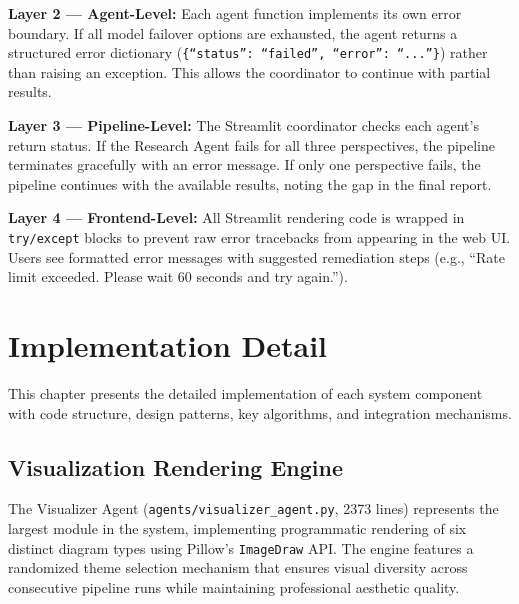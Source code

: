 \documentclass[a4paper,12pt,openany]{report}
\begin{document}
\textbf{Layer 2 --- Agent-Level:} Each agent function implements its own error boundary. If all model failover options are exhausted, the agent returns a structured error dictionary (\texttt{\{``status'': ``failed'', ``error'': ``...''\}}) rather than raising an exception. This allows the coordinator to continue with partial results.

\textbf{Layer 3 --- Pipeline-Level:} The Streamlit coordinator checks each agent's return status. If the Research Agent fails for all three perspectives, the pipeline terminates gracefully with an error message. If only one perspective fails, the pipeline continues with the available results, noting the gap in the final report.

\textbf{Layer 4 --- Frontend-Level:} All Streamlit rendering code is wrapped in \texttt{try/except} blocks to prevent raw error tracebacks from appearing in the web UI. Users see formatted error messages with suggested remediation steps (e.g., ``Rate limit exceeded. Please wait 60 seconds and try again.'').


\chapter{Implementation Detail}

This chapter presents the detailed implementation of each system component with code structure, design patterns, key algorithms, and integration mechanisms.

\section{Visualization Rendering Engine}

The Visualizer Agent (\texttt{agents/visualizer\_agent.py}, 2373 lines) represents the largest module in the system, implementing programmatic rendering of six distinct diagram types using Pillow's \texttt{ImageDraw} API. The engine features a randomized theme selection mechanism that ensures visual diversity across consecutive pipeline runs while maintaining professional aesthetic quality.
\end{document}

